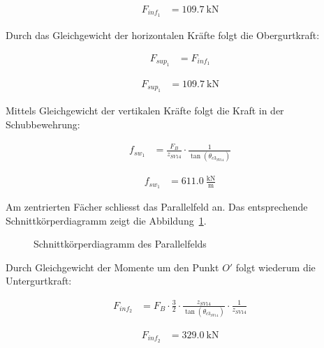 \documentclass[
  11pt,
  letterpaper,
]{scrreprt}
\begin{document}
$$
\begin{aligned}
F_{inf_{1}} &= 109.7\ \mathrm{kN} \; 
\end{aligned}
$$

Durch das Gleichgewicht der horizontalen Kräfte folgt die Obergurtkraft:

$$
\begin{aligned}
F_{sup_{1}} &= F_{inf_{1}} \; 
\end{aligned}
$$

$$
\begin{aligned}
F_{sup_{1}} &= 109.7\ \mathrm{kN} \; 
\end{aligned}
$$

Mittels Gleichgewicht der vertikalen Kräfte folgt die Kraft in der
Schubbewehrung:

$$
\begin{aligned}
f_{sw_{1}} &= \frac{ F_{B} }{ z_{SV14} } \cdot \frac{1} { \tan \left( \theta_{c3_{SV14}} \right) } \; 
\end{aligned}
$$

$$
\begin{aligned}
f_{sw_{1}} &= 611.0\ \frac{\mathrm{kN}}{\mathrm{m}} \;
\end{aligned}
$$

Am zentrierten Fächer schliesst das Parallelfeld an. Das entsprechende
Schnittkörperdiagramm zeigt die
Abbildung~\ref{fig-skd_2_spannungsfelder_sv14}.

\begin{figure}[H]


\caption{\label{fig-skd_2_spannungsfelder_sv14}Schnittkörperdiagramm des
Parallelfelds}

\end{figure}%

Durch Gleichgewicht der Momente um den Punkt \(O'\) folgt wiederum die
Untergurtkraft:

$$
\begin{aligned}
F_{inf_{2}} &= F_{B} \cdot \frac{ 3 }{ 2 } \cdot \frac{ z_{SV14} }{ \tan \left( \theta_{c3_{SV14}} \right) } \cdot \frac{1} { z_{SV14} } \; 
\end{aligned}
$$

$$
\begin{aligned}
F_{inf_{2}} &= 329.0\ \mathrm{kN} \;
\end{aligned}
$$
\end{document}
